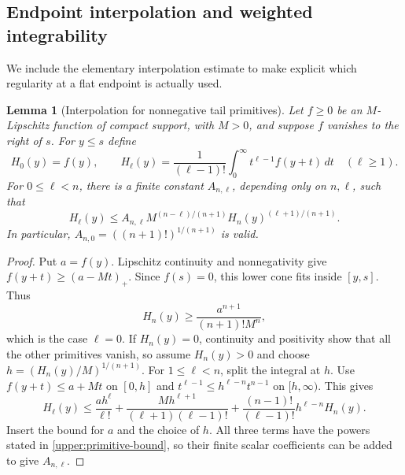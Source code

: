 \documentclass[11pt,letterpaper]{article}
\newtheorem{lemma}[theorem]{Lemma}
\theoremstyle{definition}
\theoremstyle{remark}
\begin{document}
\subsection{Endpoint interpolation and weighted integrability}

We include the elementary interpolation estimate to make explicit which
regularity at a flat endpoint is actually used.

\begin{lemma}[Interpolation for nonnegative tail primitives]
\label{upper:interpolation}
Let $f\ge0$ be an $M$-Lipschitz function of compact support, with $M>0$,
and suppose $f$ vanishes to the right of $s$.  For $y\le s$ define
\[
 H_0(y)=f(y),\qquad
 H_\ell(y)=\frac1{(\ell-1)!}\int_0^\infty t^{\ell-1}f(y+t)\,dt
 \quad(\ell\ge1).
\]
For $0\le\ell<n$, there is a finite constant $A_{n,\ell}$, depending
only on $n,\ell$, such that
\begin{equation}\label{upper:primitive-bound}
 H_\ell(y)\le
 A_{n,\ell}M^{(n-\ell)/(n+1)}H_n(y)^{(\ell+1)/(n+1)}.
\end{equation}
In particular, $A_{n,0}=((n+1)!)^{1/(n+1)}$ is valid.
\end{lemma}
\begin{proof}
Put $a=f(y)$.  Lipschitz continuity and nonnegativity give
$f(y+t)\ge(a-Mt)_+$.  Since $f(s)=0$, this lower cone fits inside
$[y,s]$.  Thus
\[
 H_n(y)\ge\frac{a^{n+1}}{(n+1)!M^n},
\]
which is the case $\ell=0$.  If $H_n(y)=0$, continuity and positivity show
that all the other primitives vanish, so assume $H_n(y)>0$ and choose
$h=(H_n(y)/M)^{1/(n+1)}$.  For $1\le\ell<n$, split the integral at $h$.
Use $f(y+t)\le a+Mt$ on $[0,h]$ and
$t^{\ell-1}\le h^{\ell-n}t^{n-1}$ on $[h,\infty)$.  This gives
\[
 H_\ell(y)\le
 \frac{a h^\ell}{\ell!}
 +\frac{M h^{\ell+1}}{(\ell+1)(\ell-1)!}
 +\frac{(n-1)!}{(\ell-1)!}h^{\ell-n}H_n(y).
\]
Insert the bound for $a$ and the choice of $h$.  All three terms have the
powers stated in \eqref{upper:primitive-bound}, so their finite scalar
coefficients can be added to give $A_{n,\ell}$.
\end{proof}
\end{document}
